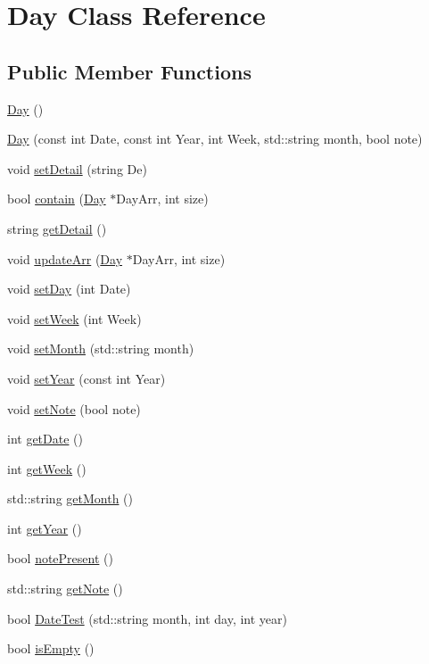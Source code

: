 \hypertarget{classDay}{\section{Day Class Reference}
\label{classDay}
}
\subsection*{Public Member Functions}
\begin{DoxyCompactItemize}
\item 
\hyperlink{classDay_a0d38b5839dd80b179cb8f0669283b3aa}{Day} ()
\item 
\hyperlink{classDay_a1f2f885b1328511d8b96b050673ba35d}{Day} (const int Date, const int Year, int Week, std\-::string month, bool note)
\item 
void \hyperlink{classDay_acb0181b89543f4a0e71f85d5ddb78651}{set\-Detail} (string De)
\item 
bool \hyperlink{classDay_a75acf851742fcd7ba36b742056c42d69}{contain} (\hyperlink{classDay}{Day} $\ast$Day\-Arr, int size)
\item 
string \hyperlink{classDay_adf187d211b1ea4561832486f7094b18b}{get\-Detail} ()
\item 
void \hyperlink{classDay_a9e9004a3ecb48ce0c4749766bd228898}{update\-Arr} (\hyperlink{classDay}{Day} $\ast$Day\-Arr, int size)
\item 
void \hyperlink{classDay_a0dcbab77f0504f01fdd9a8584b590121}{set\-Day} (int Date)
\item 
void \hyperlink{classDay_abd9ffcfab90af3e2defaa2491a3761bb}{set\-Week} (int Week)
\item 
void \hyperlink{classDay_aa6fc8b1b08074305e6b0dd3f4bc21151}{set\-Month} (std\-::string month)
\item 
void \hyperlink{classDay_a9fc013d905327fd70003970125247d91}{set\-Year} (const int Year)
\item 
void \hyperlink{classDay_a40f873f51621bdb3cf657e127d43cdaf}{set\-Note} (bool note)
\item 
int \hyperlink{classDay_a6161ef9f7717d596af00031cc362fa04}{get\-Date} ()
\item 
int \hyperlink{classDay_a43799b84e1a16df9bf16b3de69605b9a}{get\-Week} ()
\item 
std\-::string \hyperlink{classDay_ae10fc576ccdf6d58ef42c8cd1b371401}{get\-Month} ()
\item 
int \hyperlink{classDay_acec9a2c25c4e19fa6f46cd2671dfa51d}{get\-Year} ()
\item 
bool \hyperlink{classDay_a097b2409c34e772e1b133c2c344ab2bf}{note\-Present} ()
\item 
std\-::string \hyperlink{classDay_ac0d1e5a970de4e30bc563c33cf69cbc3}{get\-Note} ()
\item 
bool \hyperlink{classDay_afb77f4b9df921cfb4176ba6ef309b9b8}{Date\-Test} (std\-::string month, int day, int year)
\item 
bool \hyperlink{classDay_aa4dd0d85c6fa11300b10c2a40c530c4f}{is\-Empty} ()
\end{DoxyCompactItemize}


